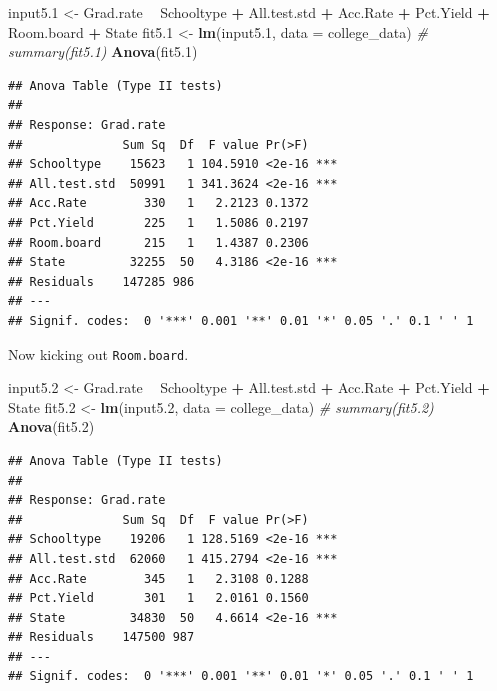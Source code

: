 \documentclass[]{article}
\newenvironment{Shaded}{\begin{snugshade}}{\end{snugshade}}
\newcommand{\KeywordTok}[1]{\textcolor[rgb]{0.13,0.29,0.53}{\textbf{#1}}}
\newcommand{\DataTypeTok}[1]{\textcolor[rgb]{0.13,0.29,0.53}{#1}}
\newcommand{\DecValTok}[1]{\textcolor[rgb]{0.00,0.00,0.81}{#1}}
\newcommand{\StringTok}[1]{\textcolor[rgb]{0.31,0.60,0.02}{#1}}
\newcommand{\CommentTok}[1]{\textcolor[rgb]{0.56,0.35,0.01}{\textit{#1}}}
\newcommand{\OperatorTok}[1]{\textcolor[rgb]{0.81,0.36,0.00}{\textbf{#1}}}
\newcommand{\NormalTok}[1]{#1}
\begin{document}
\begin{Shaded}
\begin{Highlighting}[]
\NormalTok{input5.}\DecValTok{1}\NormalTok{ <-}\StringTok{ }\NormalTok{Grad.rate }\OperatorTok{~}\StringTok{ }\NormalTok{Schooltype }\OperatorTok{+}\StringTok{ }\NormalTok{All.test.std }\OperatorTok{+}\StringTok{ }\NormalTok{Acc.Rate }\OperatorTok{+}\StringTok{ }\NormalTok{Pct.Yield }\OperatorTok{+}\StringTok{ }\NormalTok{Room.board }\OperatorTok{+}\StringTok{ }
\StringTok{    }\NormalTok{State}
\NormalTok{fit5.}\DecValTok{1}\NormalTok{ <-}\StringTok{ }\KeywordTok{lm}\NormalTok{(input5.}\DecValTok{1}\NormalTok{, }\DataTypeTok{data =}\NormalTok{ college_data)}
\CommentTok{# summary(fit5.1)}
\KeywordTok{Anova}\NormalTok{(fit5.}\DecValTok{1}\NormalTok{)}
\end{Highlighting}
\end{Shaded}

\begin{verbatim}
## Anova Table (Type II tests)
## 
## Response: Grad.rate
##              Sum Sq  Df  F value Pr(>F)    
## Schooltype    15623   1 104.5910 <2e-16 ***
## All.test.std  50991   1 341.3624 <2e-16 ***
## Acc.Rate        330   1   2.2123 0.1372    
## Pct.Yield       225   1   1.5086 0.2197    
## Room.board      215   1   1.4387 0.2306    
## State         32255  50   4.3186 <2e-16 ***
## Residuals    147285 986                    
## ---
## Signif. codes:  0 '***' 0.001 '**' 0.01 '*' 0.05 '.' 0.1 ' ' 1
\end{verbatim}

Now kicking out \texttt{Room.board}.

\begin{Shaded}
\begin{Highlighting}[]
\NormalTok{input5.}\DecValTok{2}\NormalTok{ <-}\StringTok{ }\NormalTok{Grad.rate }\OperatorTok{~}\StringTok{ }\NormalTok{Schooltype }\OperatorTok{+}\StringTok{ }\NormalTok{All.test.std }\OperatorTok{+}\StringTok{ }\NormalTok{Acc.Rate }\OperatorTok{+}\StringTok{ }\NormalTok{Pct.Yield }\OperatorTok{+}\StringTok{ }\NormalTok{State}
\NormalTok{fit5.}\DecValTok{2}\NormalTok{ <-}\StringTok{ }\KeywordTok{lm}\NormalTok{(input5.}\DecValTok{2}\NormalTok{, }\DataTypeTok{data =}\NormalTok{ college_data)}
\CommentTok{# summary(fit5.2)}
\KeywordTok{Anova}\NormalTok{(fit5.}\DecValTok{2}\NormalTok{)}
\end{Highlighting}
\end{Shaded}

\begin{verbatim}
## Anova Table (Type II tests)
## 
## Response: Grad.rate
##              Sum Sq  Df  F value Pr(>F)    
## Schooltype    19206   1 128.5169 <2e-16 ***
## All.test.std  62060   1 415.2794 <2e-16 ***
## Acc.Rate        345   1   2.3108 0.1288    
## Pct.Yield       301   1   2.0161 0.1560    
## State         34830  50   4.6614 <2e-16 ***
## Residuals    147500 987                    
## ---
## Signif. codes:  0 '***' 0.001 '**' 0.01 '*' 0.05 '.' 0.1 ' ' 1
\end{verbatim}
\end{document}
